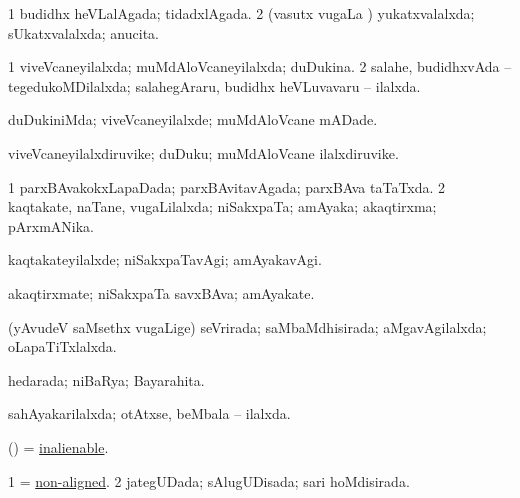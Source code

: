 \bentry
{} 
\gl{\gu}
\expl{}
\bmng
\bnum
\num{1} budidhx heVLalAgada; tidadxlAgada. 
\num{2} (vasutx \mo vugaLa \vi) yukatxvalalxda; sUkatxvalalxda; anucita. 
\enum
\emng
\eentry

\bentry
{} 
\gl{\gu}
\expl{}
\bmng
\bnum
\num{1} viveVcaneyilalxda; muMdAloVcaneyilalxda; duDukina. 
\num{2} salahe, budidhxvAda -- tegedukoMDilalxda; salahegAraru, budidhx heVLuvavaru -- ilalxda. 
\enum
\emng
\eentry

\bentry
{} 
\gl{\kirxvi}
\expl{}
\bmng
duDukiniMda; viveVcaneyilalxde; muMdAloVcane mADade. 
\emng
\eentry

\bentry
{} 
\gl{\nA}
\expl{}
\bmng
viveVcaneyilalxdiruvike; duDuku; muMdAloVcane ilalxdiruvike. 
\emng
\eentry

\bentry
{} 
\gl{\gu}
\expl{}
\bmng
\bnum
\num{1} parxBAvakokxLapaDada; parxBAvitavAgada; parxBAva taTaTxda. 
\num{2} kaqtakate, naTane, \mo vugaLilalxda; niSakxpaTa; amAyaka; akaqtirxma; pArxmANika. 
\enum
\emng
\eentry

\bentry
{} 
\gl{\kirxvi}
\expl{}
\bmng
kaqtakateyilalxde; niSakxpaTavAgi; amAyakavAgi. 
\emng
\eentry

\bentry
{} 
\gl{\nA}
\expl{}
\bmng
akaqtirxmate; niSakxpaTa savxBAva; amAyakate. 
\emng
\eentry

\bentry
{} 
\gl{\gu}
\expl{}
\bmng
(yAvudeV saMsethx \mo vugaLige) seVrirada; saMbaMdhisirada; aMgavAgilalxda; oLapaTiTxlalxda. 
\emng
\eentry

\bentry
{} 
\gl{\gu}
\expl{}
\bmng
hedarada; niBaRya; Bayarahita. 
\emng
\eentry

\bentry
{} 
\gl{\gu}
\expl{}
\bmng
sahAyakarilalxda; otAtxse, beMbala -- ilalxda. 
\emng
\eentry

\bentry
{} 
\gl{\gu}
\expl{}
\bmng
(\nAyxshA) = \hyperref{kandict_i.pdf}{I}{inalienable}{inalienable}. 
\emng
\eentry

\bentry
{} 
\gl{\gu}
\expl{}
\bmng
\bnum
\num{1} = \hyperref{kandict_n.pdf}{N}{non-aligned}{non-aligned}. 
\num{2} jategUDada; sAlugUDisada; sari hoMdisirada. 
\enum
\emng
\eentry

